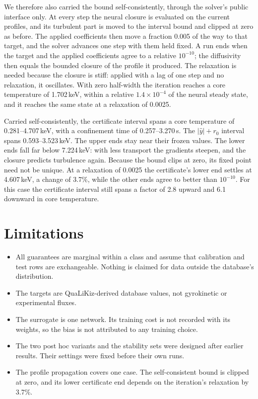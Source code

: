 \documentclass[11pt]{article}
\begin{document}
We therefore also carried the bound self-consistently, through the solver's
public interface only.  At every step the neural closure is evaluated on the
current profiles, and its turbulent part is moved to the interval bound and
clipped at zero as before.  The applied coefficients then move a fraction
0.005 of the way to that target, and the solver advances one step with them
held fixed.  A run ends when the target and the applied coefficients agree to
a relative $10^{-10}$; the diffusivity then equals the bounded closure of the
profile it produced.  The relaxation is needed because the closure is stiff:
applied with a lag of one step and no relaxation, it oscillates.  With zero
half-width the iteration reaches a core temperature of 1.702\,keV, within a
relative $1.4 \times 10^{-4}$ of the neural steady state, and it reaches the
same state at a relaxation of 0.0025.

Carried self-consistently, the certificate interval spans a core temperature
of 0.281--4.707\,keV, with a confinement time of 0.257--3.270\,s.  The
$|\hat{y}| + r_0$ interval spans 0.593--3.523\,keV.  The upper ends stay
near their frozen values.  The lower ends fall far below 7.224\,keV: with less
transport the gradients steepen, and the closure predicts turbulence again.
Because the bound clips at zero, its fixed point need not be unique.  At a
relaxation of 0.0025 the certificate's lower end settles at 4.607\,keV, a
change of 3.7\%, while the other ends agree to better than $10^{-10}$.  For
this case the certificate interval still spans a factor of 2.8 upward and 6.1
downward in core temperature.

\section{Limitations}

\begin{itemize}
\item All guarantees are marginal within a class and assume that calibration
and test rows are exchangeable.  Nothing is claimed for data outside the
database's distribution.
\item The targets are QuaLiKiz-derived database values, not gyrokinetic or
experimental fluxes.
\item The surrogate is one network.  Its training cost is not recorded with
its weights, so the bias is not attributed to any training choice.
\item The two post hoc variants and the stability sets were designed after
earlier results.  Their settings were fixed before their own runs.
\item The profile propagation covers one case.  The self-consistent bound is
clipped at zero, and its lower certificate end depends on the iteration's
relaxation by 3.7\%.
\end{itemize}
\end{document}
